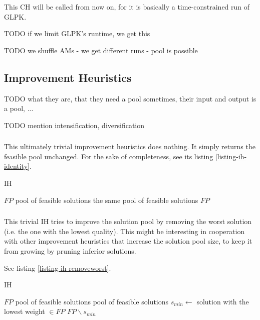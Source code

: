 This CH will be called  from now on, for it is basically a time-constrained run of GLPK.

TODO if we limit GLPK's runtime, we get this

TODO we shuffle AMs - we get different runs - pool is possible

\subsection{Improvement Heuristics}


TODO what they are, that they need a pool sometimes, their input and output is a pool, ...

TODO mention intensification, diversification

\subsubsection{}

This ultimately trivial improvement heuristics does nothing. It simply returns the feasible pool unchanged. For the sake of completeness, see its listing \ref{listing-ih-identity}.

\begin{algorithm}
\caption{ IH}
\label{listing-ih-identity}
\begin{algorithmic}
\REQUIRE $FP$ pool of feasible solutions
\ENSURE the same pool of feasible solutions
\RETURN $FP$
\end{algorithmic}
\end{algorithm}

\subsubsection{}

This trivial IH tries to improve the solution pool by removing the worst solution (i.e. the one with the lowest quality). This might be interesting in cooperation with other improvement heuristics that increase the solution pool size, to keep it from growing by pruning inferior solutions.

See listing \ref{listing-ih-removeworst}.

\begin{algorithm}
\caption{ IH}
\label{listing-ih-removeworst}
\begin{algorithmic}
\REQUIRE $FP$ pool of feasible solutions
\ENSURE pool of feasible solutions
\STATE $s_{min} \gets $ solution with the lowest weight $\in FP$
\RETURN $FP \backslash s_{min}$
\end{algorithmic}
\end{algorithm}

